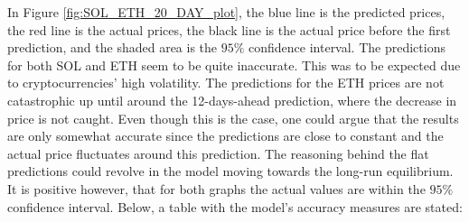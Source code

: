 \noindent In Figure \ref{fig:SOL_ETH_20_DAY_plot}, the blue line is the predicted prices, the red line is the actual prices, the black line is the actual price before the first prediction, and the shaded area is the $95\%$ confidence interval. The predictions for both SOL and ETH seem to be quite inaccurate. This was to be expected due to cryptocurrencies' high volatility. The predictions for the ETH prices are not catastrophic up until around the 12-days-ahead prediction, where the decrease in price is not caught. Even though this is the case, one could argue that the results are only somewhat accurate since the predictions are close to constant and the actual price fluctuates around this prediction. The reasoning behind the flat predictions could revolve in the model moving towards the long-run equilibrium. It is positive however, that for both graphs the actual values are within the $95\%$ confidence interval. Below, a table with the model's accuracy measures are stated:

